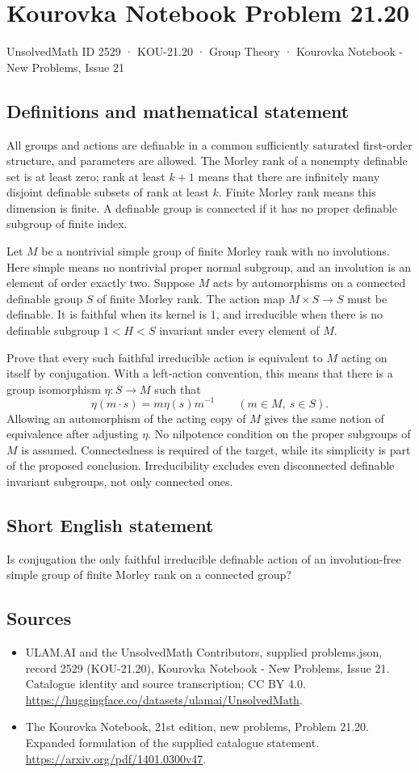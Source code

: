 \documentclass[11pt,a4paper]{article}
\begin{document}
\section*{Kourovka Notebook Problem 21.20}\label{2529}
{\small UnsolvedMath ID 2529 · KOU-21.20 · Group Theory · Kourovka Notebook - New Problems, Issue 21}
\subsection{Definitions and mathematical statement}
All groups and actions are definable in a common sufficiently saturated
first-order structure, and parameters are allowed. The Morley rank of
a nonempty definable set is at least zero; rank at least $k+1$ means
that there are infinitely many disjoint definable subsets of rank at
least $k$. Finite Morley rank means this dimension is finite.
A definable group is connected if it has no proper definable subgroup
of finite index.

Let $M$ be a nontrivial simple group of finite Morley rank with no
involutions. Here simple means no nontrivial proper normal subgroup,
and an involution is an element of order exactly two. Suppose $M$
acts by automorphisms on a connected definable group $S$ of finite
Morley rank. The action map $M\times S\to S$ must be definable.
It is faithful when its kernel is $1$, and irreducible when there is
no definable subgroup $1<H<S$ invariant under every element of $M$.

Prove that every such faithful irreducible action is equivalent to
$M$ acting on itself by conjugation. With a left-action convention,
this means that there is a group isomorphism $\eta:S\to M$ such that
\[
 \eta(m\cdot s)=m\eta(s)m^{-1}
                    \qquad(m\in M,\ s\in S).
\]
Allowing an automorphism of the acting copy of $M$ gives the same
notion of equivalence after adjusting $\eta$.
No nilpotence condition on the proper subgroups of $M$ is assumed.
Connectedness is required of the target, while its simplicity is part
of the proposed conclusion. Irreducibility excludes even disconnected
definable invariant subgroups, not only connected ones.
\subsection{Short English statement}
Is conjugation the only faithful irreducible definable action of an involution-free simple group of finite Morley rank on a connected group?
\subsection{Sources}
\begin{itemize}
\item[S1] ULAM.AI and the UnsolvedMath Contributors, supplied problems.json, record 2529 (KOU-21.20), Kourovka Notebook - New Problems, Issue 21. Catalogue identity and source transcription; CC BY 4.0.
\url{https://huggingface.co/datasets/ulamai/UnsolvedMath}.
\item[S2] The Kourovka Notebook, 21st edition, new problems, Problem 21.20. Expanded formulation of the supplied catalogue statement.
\url{https://arxiv.org/pdf/1401.0300v47}.
\end{itemize}
\end{document}
